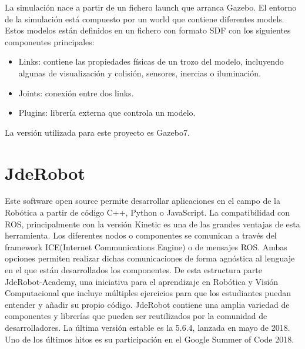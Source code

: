 \documentclass[12pt,spanish,chapterprefix, numbers=noenddot]{book}
\numberwithin{equation}{section}
\numberwithin{figure}{section}
\begin{document}
La simulación nace a partir de un fichero launch que arranca Gazebo. El entorno de la simulación está compuesto por un world que contiene diferentes models. Estos modelos están definidos en un fichero con formato SDF con los siguientes componentes principales:
\begin{itemize}
\item Links: contiene las propiedades físicas de un trozo del modelo, incluyendo algunas de visualización y colisión, sensores, inercias o iluminación.
\item Joints: conexión entre dos links.
\item Plugins: librería externa que controla un modelo. 
\end{itemize}
La versión utilizada para este proyecto es Gazebo7.

\section{JdeRobot}
Este software open source permite desarrollar aplicaciones en el campo de la Robótica a partir de código C++, Python o JavaScript. La compatibilidad con ROS, principalmente con la versión Kinetic es una de las grandes ventajas de esta herramienta.  Los diferentes nodos o componentes se comunican a través del framework ICE(Internet Communications Engine) o de mensajes ROS. Ambas opciones permiten realizar dichas comunicaciones de forma agnóstica al lenguaje en el que están desarrollados los componentes.  
De esta estructura parte JdeRobot-Academy, una iniciativa para el aprendizaje en Robótica y Visión Computacional que incluye múltiples ejercicios para que los estudiantes puedan entender y añadir su propio código. JdeRobot  contiene una amplia variedad de componentes y librerías que pueden ser reutilizados por la comunidad de desarrolladores. 
La última versión estable es la 5.6.4, lanzada en mayo de 2018. Uno de los últimos hitos es su participación en el Google Summer of Code 2018. 
\end{document}
